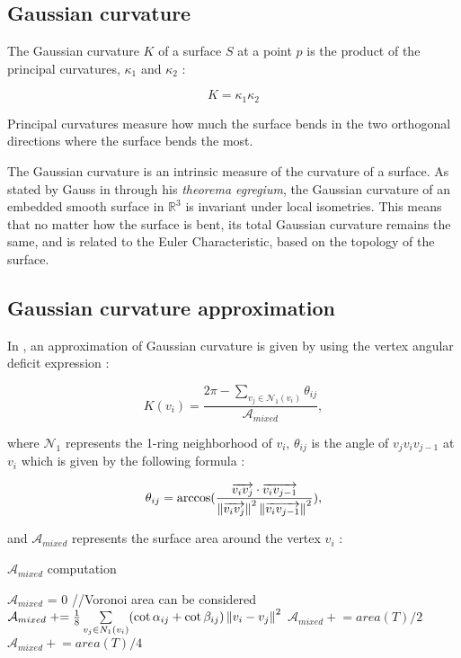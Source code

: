\documentclass[11pt,fleqn]{book} %
\begin{document}
\begin{appendices}
\section{Gaussian curvature}
\label{sec:gaussian_curvature}
The Gaussian curvature $K$ of a surface $S$ at a point $p$ is the product of the principal curvatures, $\kappa_1$ and $\kappa_2$ :

\begin{equation}
	K = \kappa_1\kappa_2
\end{equation}

Principal curvatures measure how much the surface bends in the two orthogonal directions where the surface bends the most.

The Gaussian curvature is an intrinsic measure of the curvature of a surface. 
As stated by Gauss in \cite{Gau28} through his \textit{theorema egregium}, the Gaussian curvature of an embedded smooth surface in $\mathbb{R}^3$ is invariant under local isometries.
This means that no matter how the surface is bent, its total Gaussian curvature remains the same, and is related to the Euler Characteristic, based on the topology of the surface.

\subsection{Gaussian curvature approximation}
In \cite{MMPB02}, an approximation of Gaussian curvature is given by using the vertex angular deficit expression :

\begin{equation}
	K(v_i) = \frac{2\pi -\sum_{v_j \in \mathcal{N}_1(v_i)} \theta_{ij}}{\mathcal{A}_{mixed}},
\end{equation}

where $\mathcal{N}_1$ represents the 1-ring neighborhood of $v_i$, $\theta_{ij}$ is the angle of $v_jv_iv_{j-1}$ at $v_i$ which is given by the following formula : 

\begin{equation}
	\theta_{ij} = \arccos(\frac{\overrightarrow{v_iv_j} \cdot \overrightarrow{v_i v_{j-1}}}
	{\left\lVert\overrightarrow{v_iv_j}\right\rVert^2\left\lVert\overrightarrow{v_iv_{j-1}}\right\rVert^2}),
\end{equation} 

and $\mathcal{A}_{mixed}$ represents the surface area around the vertex $v_i$ : 

\begin{algorithm}
\caption{$\mathcal{A}_{mixed}$ computation}
\begin{algorithmic}
\State $\mathcal{A}_{mixed}$ = 0
		//Voronoi area can be considered
		\State $\mathcal{A}_{mixed} \mathrel{+}= \frac{1}{8} \sum\limits_{v_j \in N_1(v_i)} (\cot \alpha_{ij} + \cot \beta_{ij}) \left\lVert v_i-v_j\right\rVert^2$
	\Else
			\State $\mathcal{A}_{mixed} \mathrel{+}= area(T)/2$
		\Else
			\State $\mathcal{A}_{mixed} \mathrel{+}= area(T)/4$
		\EndIf
	\EndIf
\EndFor
\end{algorithmic}
\end{algorithm}


\end{appendices}
\end{document}
